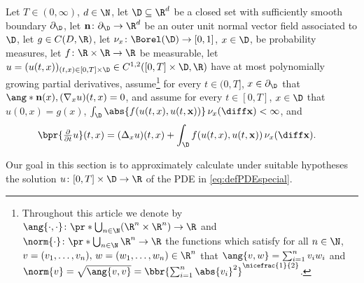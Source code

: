 Let
	$ T \in (0,\infty) $,
	$ d \in \N $,
let
	$\D \subseteq \R^d$
	be a closed set with sufficiently smooth boundary	$\partial_\D$,
let 
	$ \mathbf{n} \colon \partial_\D \to \R^d $ 
	be an outer unit normal vector field associated to $\D$,
let
	$g\in C(D, \R)$,
let
	$\nu_x \colon \Borel(\D) \to [0,1]$,
	$x \in \D$,
	be probability measures,
let
	$f \colon \R \times \R \to \R$
	be measurable,
let
	$u=(u(t,x))_{(t,x)\in [0,T]\times\D}\in C^{1,2}([0,T]\times\D,\R)$
	have at most polynomially growing partial derivatives, 
assume\footnote{Throughout this article we denote
by 
	$\ang{\cdot,\cdot}\colon\pr*{\bigcup_{n\in\N} (\R^n\times\R^n)}\to\R$
	and $\norm{\cdot}\colon\pr*{\bigcup_{n\in\N}\R^n}\to\R$ the 
functions which satisfy for all 
	$n\in\N$, 
	$v=(v_1,\dots,v_n),\,w=(w_1,\dots,w_n)\in\R^n$
that
	$\ang{v,w}=\sum_{i=1}^n v_iw_i$
and $\norm{v}=\sqrt{\ang{v,v}}=\bbr{\sum_{i=1}^n \abs{v_i}^2}^{\nicefrac{1}{2}}$.
}
	for every
		$t\in (0,T]$,
		$x\in \partial_\D$
	that
		$ \ang*{\mathbf{n}(x) ,(\nabla_x u)(t,x)} = 0$,
and assume 
	for every
		$t\in [0,T]$,
		$x\in\D$
	that
		$u(0,x)=g(x)$,
		$\int_\D \abs{f(u(t,x),u(t,\mathbf{x})) } \, \nu_x(\diff\mathbf{x}) < \infty$,
		and
	\begin{equation}
	\begin{split}
	\label{eq:defPDEspecial}
		\bpr{\tfrac{\partial}{\partial t}u}(t,x)
		&=
		(\Delta_x u)(t,x)+\int_{\D} f(u(t,x),u(t,\mathbf{x})) \, \nu_x(\diff\mathbf{x})
		.
	\end{split}
	\end{equation}

Our goal in this section is to approximately calculate under suitable hypotheses the solution $u\colon [0,T]\times \D \to \R$ of the PDE in \eqref{eq:defPDEspecial}.
%
%

